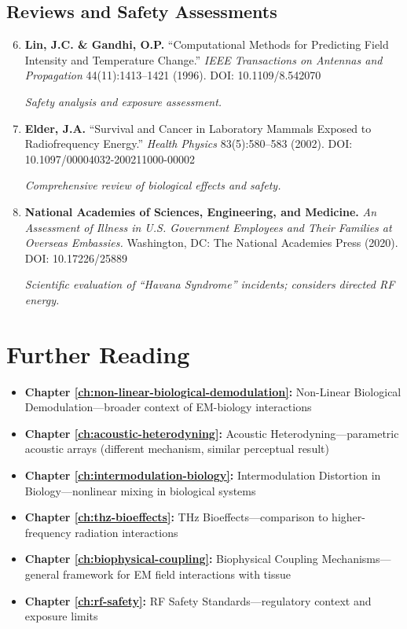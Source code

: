\subsection*{Reviews and Safety Assessments}

\begin{enumerate}
\setcounter{enumi}{5}
\item \textbf{Lin, J.C. \& Gandhi, O.P.} ``Computational Methods for Predicting Field Intensity and Temperature Change.'' \emph{IEEE Transactions on Antennas and Propagation} 44(11):1413--1421 (1996). DOI: 10.1109/8.542070

\textit{Safety analysis and exposure assessment.}

\item \textbf{Elder, J.A.} ``Survival and Cancer in Laboratory Mammals Exposed to Radiofrequency Energy.'' \emph{Health Physics} 83(5):580--583 (2002). DOI: 10.1097/00004032-200211000-00002

\textit{Comprehensive review of biological effects and safety.}

\item \textbf{National Academies of Sciences, Engineering, and Medicine.} \emph{An Assessment of Illness in U.S. Government Employees and Their Families at Overseas Embassies.} Washington, DC: The National Academies Press (2020). DOI: 10.17226/25889

\textit{Scientific evaluation of ``Havana Syndrome'' incidents; considers directed RF energy.}
\end{enumerate}

\section{Further Reading}

\begin{itemize}
\item \textbf{Chapter \ref{ch:non-linear-biological-demodulation}:} Non-Linear Biological Demodulation---broader context of EM-biology interactions

\item \textbf{Chapter \ref{ch:acoustic-heterodyning}:} Acoustic Heterodyning---parametric acoustic arrays (different mechanism, similar perceptual result)

\item \textbf{Chapter \ref{ch:intermodulation-biology}:} Intermodulation Distortion in Biology---nonlinear mixing in biological systems

\item \textbf{Chapter \ref{ch:thz-bioeffects}:} THz Bioeffects---comparison to higher-frequency radiation interactions

\item \textbf{Chapter \ref{ch:biophysical-coupling}:} Biophysical Coupling Mechanisms---general framework for EM field interactions with tissue

\item \textbf{Chapter \ref{ch:rf-safety}:} RF Safety Standards---regulatory context and exposure limits
\end{itemize}
